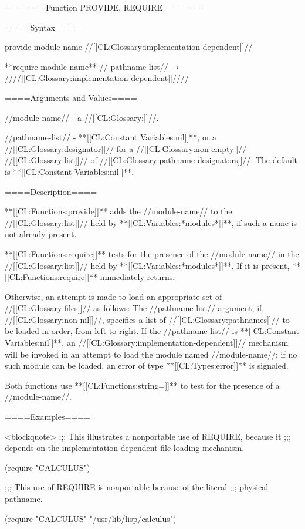 ====== Function PROVIDE, REQUIRE ======

====Syntax====

\DefunWithValues provide {module-name} {//[[CL:Glossary:implementation-dependent]]//}

**require {module-name** //\opt} pathname-list// → ////[[CL:Glossary:implementation-dependent]]////

====Arguments and Values====

//module-name// - a //[[CL:Glossary:\symbolnamedesignator]]//.

//pathname-list// - **[[CL:Constant Variables:nil]]**, or a //[[CL:Glossary:designator]]// for a //[[CL:Glossary:non-empty]]// //[[CL:Glossary:list]]// of //[[CL:Glossary:pathname designators]]//. The default is **[[CL:Constant Variables:nil]]**.

====Description====

**[[CL:Functions:provide]]** adds the //module-name// to the //[[CL:Glossary:list]]// held by **[[CL:Variables:*modules*]]**, if such a name is not already present.

**[[CL:Functions:require]]** tests for the presence of the //module-name// in the //[[CL:Glossary:list]]// held by **[[CL:Variables:*modules*]]**. If it is present, **[[CL:Functions:require]]** immediately returns.

Otherwise, an attempt is made to load an appropriate set of //[[CL:Glossary:files]]// as follows: The //pathname-list// argument, if //[[CL:Glossary:non-nil]]//, specifies a list of //[[CL:Glossary:pathnames]]// to be loaded in order, from left to right. If the //pathname-list// is **[[CL:Constant Variables:nil]]**, an //[[CL:Glossary:implementation-dependent]]// mechanism will be invoked in an attempt to load the module named //module-name//; if no such module can be loaded, an error of type **[[CL:Types:error]]** is signaled.

Both functions use **[[CL:Functions:string=]]** to test for the presence of a //module-name//.

====Examples====

<blockquote> ;;; This illustrates a nonportable use of REQUIRE, because it ;;; depends on the implementation-dependent file-loading mechanism.

(require "CALCULUS")

;;; This use of REQUIRE is nonportable because of the literal ;;; physical pathname.

(require "CALCULUS" "/usr/lib/lisp/calculus")

